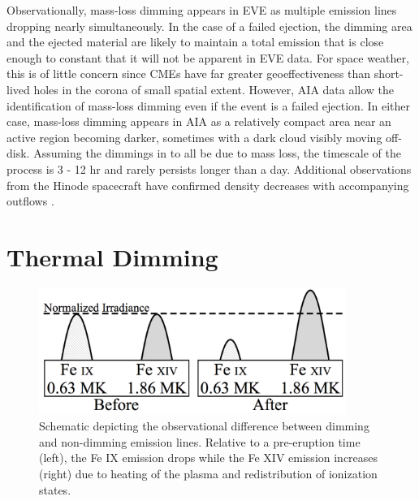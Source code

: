 Observationally, mass-loss dimming appears in EVE as multiple emission lines dropping nearly simultaneously. In the case of a failed ejection, the dimming area and the ejected material are likely to maintain a total emission that is close enough to constant that it will not be apparent in EVE data. For space weather, this is of little concern since CMEs have far greater geoeffectiveness than short-lived holes in the corona of small spatial extent. However, AIA data allow the identification of mass-loss dimming even if the event is a failed ejection. In either case, mass-loss dimming appears in AIA as a relatively compact area near an active region becoming darker, sometimes with a dark cloud visibly moving off-disk. Assuming the dimmings in \citet{Reinard2008} to all be due to mass loss, the timescale of the process is 3 - 12 hr and rarely persists longer than a day. Additional observations from the Hinode spacecraft have confirmed density decreases with accompanying outflows \citep{Attrill2010, Harra2010, Tian2012}.

\section{Thermal Dimming}

\begin{figure}[!h]
	\caption[Schematic of thermal dimming]{
	    Schematic depicting the observational difference between dimming and non-dimming emission
	    lines. Relative to a pre-eruption time (left), the Fe IX emission drops while the Fe XIV
	    emission increases (right) due to heating of the plasma and redistribution of ionization
	    states.
	}
    \begin{center}
	    \includegraphics[width=100mm]{Images/ThermalDimming.png}
    \end{center}
    \label{thermalDimming}
\end{figure}

